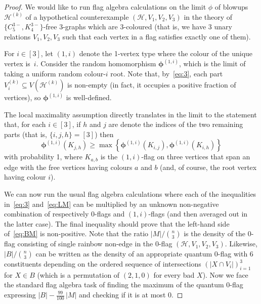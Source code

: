 \documentclass[11pt,a4paper]{article}
\theoremstyle{remark}
\newcommand{\C}[1]{\mathcal{#1}}
\begin{document}
\begin{proof}
We would like to run flag algebra calculations on the limit $\phi$ of blowups $\C H^{(k)}$
of a hypothetical counterexample $(\C H,V_1,V_2,V_3)$ in the theory of $\{C_{5}^{3-},K_{4}^{3-}\}$-free $3$-graphs which are 3-coloured (that is, we have 3 unary relations $V_1,V_2,V_3$ such that each vertex in a flag satisfies exactly one of them). 

For $i\in [3]$, let $(1,i)$ denote the 1-vertex type where the colour of the unique vertex is~$i$.
Consider the random homomorphism $\boldsymbol{\phi}^{(1,i)}$, which is the limit 
of taking a uniform random colour-$i$ root. Note that, by~\eqref{eq:3}, each part $V_i^{(k)}\subseteq V(\C H^{(k)})$ is non-empty (in fact, it occupies a positive fraction of vertices), so $\boldsymbol{\phi}^{(1,i)}$ is well-defined.


The local maximality assumption directly translates in the limit to the  statement that, for each $i\in [3]$, if $h$ and $j$ are denote the indices of the two remaining parts (that is, $\{i,j,h\}=[3]$) then
 \begin{equation}\label{eq:LM}
 \boldsymbol{\phi}^{(1,i)}(K_{j,h})\ge \max
\left\{\boldsymbol{\phi}^{(1,i)}(K_{i,j}),\boldsymbol{\phi}^{(1,i)}(K_{i,h})\right\}
\end{equation}
  with probability 1, where $K_{a,b}$ is the $(1,i)$-flag on three vertices that span an edge with the free vertices having colours $a$ and $b$ (and, of course, the root vertex having colour $i$). 

We can now run the usual flag algebra calculations where each of the inequalities in~\eqref{eq:3} and~\eqref{eq:LM} can be multiplied by an unknown non-negative combination of respectively 0-flags and $(1,i)$-flags (and then averaged out in the latter case). The final inequality should prove that the left-hand side of~\eqref{eq:BM} is non-positive. Note that the ratio $|M|/{n\choose 3}$    is the density of the 0-flag consisting of single rainbow non-edge in the 0-flag $(\C H,V_1,V_2,V_3)$. Likewise, 
$|B|/{n\choose 3}$  can be written as the density of an appropriate quantum 0-flag with $6$ constituents depending on the ordered sequence of intersections $(|X\cap V_i|)_{i=1}^3$ for $X\in B$ (which is a permutation of $(2,1,0)$ for every bad $X$).  
Now we face the standard flag algebra task of finding the maximum of the quantum 0-flag expressing $|B|-\frac{99}{100}\, |M|$ and checking if it is at most 0. 


\end{proof}
\end{document}
